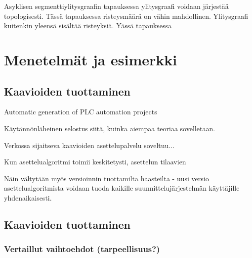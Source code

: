 \documentclass[finnish,12pt]{article}
\begin{document}
Asyklisen segmenttiylitysgraafin tapauksessa ylitysgraafi voidaan järjestää topologisesti. Tässä tapauksessa risteysmäärä on vähin mahdollinen. Ylitysgraafi kuitenkin yleensä sisältää risteyksiä. Yässä tapauksessa 

	\clearpage
	\section{Menetelmät ja esimerkki}

		\subsection{Kaavioiden tuottaminen}

Automatic generation of PLC automation projects

Käytännönläheinen selostus siitä, kuinka aiempaa teoriaa sovelletaan.

Verkossa sijaitseva kaavioiden asettelupalvelu soveltuu...

Kun asettelualgoritmi toimii keskitetysti, asettelun tilaavien

Näin vältytään myös versioinnin tuottamilta haasteilta - uusi versio asettelualgoritmista voidaan tuoda kaikille suunnittelujärjestelmän käyttäjille yhdenaikaisesti.

		\subsection{Kaavioiden tuottaminen}
			\subsubsection{Vertaillut vaihtoehdot (tarpeellisuus?)}
\end{document}
